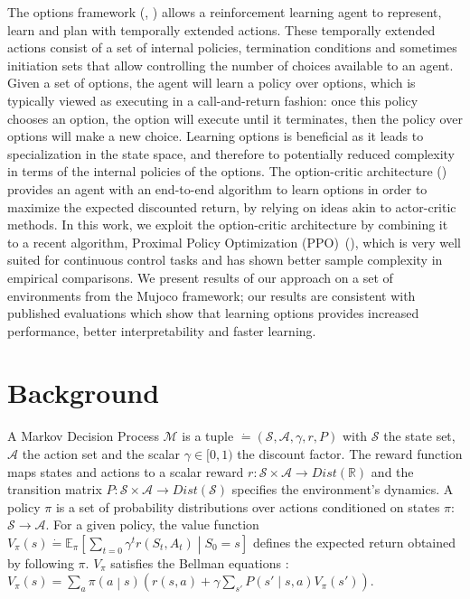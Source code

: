 \documentclass{article}
\def\given{\middle\vert}
\def\expectation{\mathbb{E}}
\def\prob{P}
\def\defeq{\dot=}
\def\states{\mathscr{S}}
\def\actions{\mathscr{A}}
\begin{document}
The options framework (\cite{SuttonPrecupSingh1999}, \cite{Precup2000}) allows a reinforcement learning agent to represent, learn and plan with temporally extended actions. These temporally extended actions consist of a set of internal policies, termination conditions and sometimes initiation sets that allow controlling the number of choices available to an agent. Given a set of options, the agent will learn a policy over options, which is typically viewed as executing in a call-and-return fashion: once this policy chooses an option, the option will execute until it terminates, then the policy over options will make a new choice. Learning options is beneficial as it leads to specialization in the state space, and therefore to potentially reduced complexity in terms of the internal policies of the options. 
The option-critic architecture (\cite{Bacon2017}) provides an agent with an end-to-end algorithm to learn options in order to maximize the expected discounted return, by relying on ideas akin to actor-critic methods.
In this work, we exploit the option-critic architecture by combining it to a recent algorithm, Proximal Policy Optimization (PPO)~(\cite{SchulmanWDRK17}), which is very well suited for continuous control tasks and has shown better sample complexity in empirical comparisons. We present results of our approach on a set of environments from the Mujoco framework; our results are consistent with published evaluations which show that learning options provides increased performance, better interpretability and faster learning.  
\vspace*{-8pt}




\section{Background}
\label{gen_inst}
\vspace*{-8pt}


A Markov Decision Process $\mathcal{M}$ is a tuple $ \defeq (\mathcal{S}, \mathcal{A}, \gamma, r, P)$ with $\mathcal{S}$ the state set, $\mathcal{A}$ the action set and the scalar $\gamma\in [0,1)$ the discount factor. The reward function maps states and actions to a scalar reward $r : \states \times \actions \rightarrow Dist(\mathbb{R})$ and the transition matrix $P: \states \times \actions \to Dist(\states)$ specifies the environment's dynamics.
A policy $\pi$ is a set of probability distributions over actions conditioned on states $\pi$: $\states \to \actions$. For a given policy, the value function $V_\pi(s) \defeq \expectation_\pi\left[ \sum_{t=0} \gamma^t r(S_t, A_t) \given S_0 = s\right]$ defines the expected return obtained by following $\pi$. $V_\pi$ satisfies the Bellman equations : $ V_\pi(s) = \sum_{a} \pi\left(a \given s\right)\left( r(s, a) + \gamma \sum_{s'} \prob\left(s' \given s, a\right) V_\pi(s')\right)$.
\end{document}

